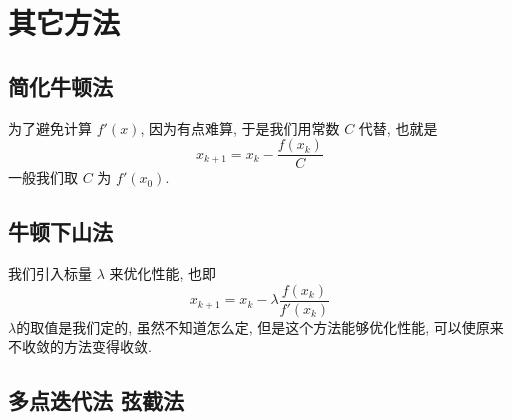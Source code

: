\section{其它方法}
\subsection{简化牛顿法}
\begin{frame}
为了避免计算 \( f'(x)\), 因为有点难算, 于是我们用常数 \(C\) 代替, 也就是
\[
x _{k+1} = x_{k} - \frac{f(x_{k})}{C}
\]
一般我们取 \(C\) 为 \(f ' (x _{0})\).

\end{frame}
\subsection{牛顿下山法}
\begin{frame}
我们引入标量 \( \lambda\) 来优化性能, 也即
\[
x _{k+1} = x _{k} - \lambda \frac{f(x_{k})}{f'(x_{k})}
\]
\(\lambda\)的取值是我们定的, 虽然不知道怎么定, 但是这个方法能够优化性能, 可以使原来不收敛的方法变得收敛.
\end{frame}
\subsection{多点迭代法 弦截法}
